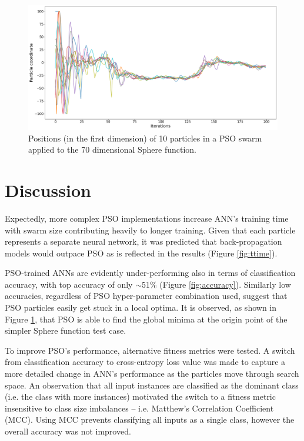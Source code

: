 \documentclass[12pt]{article}
\begin{document}
\begin{figure}[H]
  \centering
  \includegraphics[width=1\textwidth]{figs/sphere_pso.png}
  \caption{Positions (in the first dimension) of 10 particles in a PSO swarm applied to the 70 dimensional Sphere function.}
  \label{fig:sphere}
\end{figure}

\vspace{-1.5em}
\section{Discussion}
\vspace{-1.5em}

Expectedly, more complex PSO implementations increase ANN's training time with swarm size contributing heavily to longer training. Given that each particle represents a separate neural network, it was predicted that back-propagation models would outpace PSO as is reflected in the results (Figure \ref{fig:ttime}).

PSO-trained ANNs are evidently under-performing also in terms of classification accuracy, with top accuracy of only  $\sim$51\%  (Figure \ref{fig:accuracy}). Similarly low accuracies, regardless of PSO hyper-parameter combination used, suggest that PSO particles easily get stuck in a local optima. It is observed, as shown in Figure \ref{fig:sphere}, that PSO is able to find the global minima at the origin point of the simpler Sphere function test case.

To improve PSO's performance, alternative fitness metrics were tested. A switch from classification accuracy to cross-entropy loss value was made to capture a more detailed change in ANN's performance as the particles move through search space.  An observation that all input instances are classified as the dominant class (i.e. the class with more instances) motivated the switch to a fitness metric insensitive to class size  imbalances -- i.e. Matthew's Correlation Coefficient (MCC). Using MCC prevents classifying all inputs as a single class, however the overall accuracy was not improved.
\end{document}
